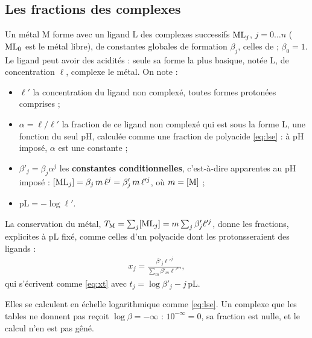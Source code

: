 \documentclass[a4paper,11pt]{article}
\newcommand\gras[1]{\textbf{#1}}
\newcommand\pH{\ensuremath{\mathrm{pH}}\xspace}
\newcommand\pL{\ensuremath{\mathrm{pL}}\xspace}
\begin{document}
\subsection{Les fractions des complexes}
Un métal M forme avec un ligand L des complexes successifs $\ce{ML}_j$, $j=0\dots n$ ($\ce{ML}_0$ est le métal libre), de constantes globales de formation $\beta_j$, celles de  ; $\beta_0=1$.
Le ligand peut avoir des acidités : seule sa forme la plus basique, notée L, de concentration $\ell$, complexe le métal.
On note :
\begin{itemize}
\item $\ell'$ la concentration du ligand non complexé, toutes formes protonées comprises ;
\item $\alpha=\ell/\ell'$ la fraction de ce ligand non complexé qui est sous la forme L, une fonction du seul \pH, calculée comme une fraction de polyacide \eqref{eq:lse} : à \pH imposé, $\alpha$ est une constante ;
\item $\beta'_j=\beta_j\alpha^j$ les \gras{constantes conditionnelles}, c'est-à-dire apparentes au \pH imposé : $[\ce{ML}_j]=\beta_j\,m\,\ell^j=\beta'_j\,m\,\ell'^j$, où $m=[\ce{M}]$ ;
\item $\pL=-\log\ell'$.
\end{itemize}
La conservation du métal, $T_\mathrm M=\sum_j[\ce{ML}_j]=m\sum_j\beta'_j\ell'^j$, donne les fractions, explicites à \pL fixé, comme celles d'un polyacide dont les \og protons\fg seraient des ligands :
\begin{align}
x_j=\frac{\beta'_j\ell'^j}{\sum_m\beta'_m\ell'^m},
\end{align}
qui s'écrivent comme \eqref{eq:xt} avec $t_j=\log\beta'_j-j\,\pL$.
\begin{algo}
Elles se calculent en échelle logarithmique comme \eqref{eq:lse}.
Un complexe que les tables ne donnent pas reçoit $\log\beta=-\infty$ : $10^{-\infty}=0$, sa fraction est nulle, et le calcul n'en est pas gêné.
\end{algo}
\end{document}
